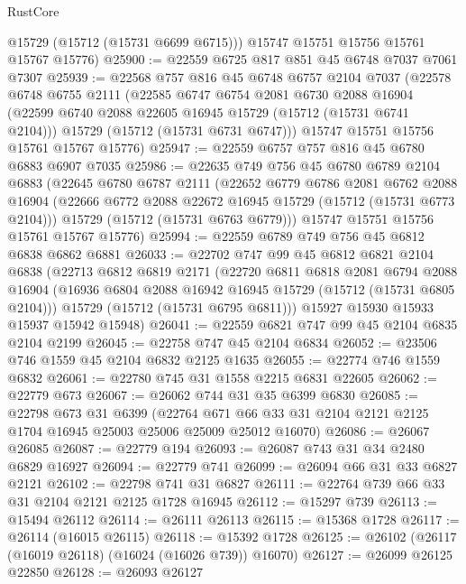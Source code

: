 \begin{lexlean}{RustCore}
\begin{coremodule}
        @15729
        (@15712 (@15731 @6699 @6715)))
      @15747
      @15751
      @15756
      @15761
      @15767
      @15776)
@25900 := @22559 @6725 @817 @851 @45 @6748 @7037 @7061 @7307
@25939 := @22568
    @757
    @816
    @45
    @6748
    @6757
    @2104
    @7037
    (@22578
      @6748
      @6755
      @2111
      (@22585
        @6747
        @6754
        @2081
        @6730
        @2088
        @16904
        (@22599 @6740 @2088 @22605 @16945 @15729 (@15712 (@15731 @6741 @2104)))
        @15729
        (@15712 (@15731 @6731 @6747)))
      @15747
      @15751
      @15756
      @15761
      @15767
      @15776)
@25947 := @22559 @6757 @757 @816 @45 @6780 @6883 @6907 @7035
@25986 := @22635
    @749
    @756
    @45
    @6780
    @6789
    @2104
    @6883
    (@22645
      @6780
      @6787
      @2111
      (@22652
        @6779
        @6786
        @2081
        @6762
        @2088
        @16904
        (@22666 @6772 @2088 @22672 @16945 @15729 (@15712 (@15731 @6773 @2104)))
        @15729
        (@15712 (@15731 @6763 @6779)))
      @15747
      @15751
      @15756
      @15761
      @15767
      @15776)
@25994 := @22559 @6789 @749 @756 @45 @6812 @6838 @6862 @6881
@26033 := @22702
    @747
    @99
    @45
    @6812
    @6821
    @2104
    @6838
    (@22713
      @6812
      @6819
      @2171
      (@22720
        @6811
        @6818
        @2081
        @6794
        @2088
        @16904
        (@16936 @6804 @2088 @16942 @16945 @15729 (@15712 (@15731 @6805 @2104)))
        @15729
        (@15712 (@15731 @6795 @6811)))
      @15927
      @15930
      @15933
      @15937
      @15942
      @15948)
@26041 := @22559 @6821 @747 @99 @45 @2104 @6835 @2104 @2199
@26045 := @22758 @747 @45 @2104 @6834
@26052 := @23506 @746 @1559 @45 @2104 @6832 @2125 @1635
@26055 := @22774 @746 @1559 @6832
@26061 := @22780 @745 @31 @1558 @2215 @6831 @22605
@26062 := @22779 @673
@26067 := @26062 @744 @31 @35 @6399 @6830
@26085 := @22798
    @673
    @31
    @6399
    (@22764 @671 @66 @33 @31 @2104 @2121 @2125 @1704 @16945 @25003 @25006 @25009 @25012 @16070)
@26086 := @26067 @26085
@26087 := @22779 @194
@26093 := @26087 @743 @31 @34 @2480 @6829 @16927
@26094 := @22779 @741
@26099 := @26094 @66 @31 @33 @6827 @2121
@26102 := @22798 @741 @31 @6827
@26111 := @22764 @739 @66 @33 @31 @2104 @2121 @2125 @1728 @16945
@26112 := @15297 @739
@26113 := @15494 @26112
@26114 := @26111 @26113
@26115 := @15368 @1728
@26117 := @26114 (@16015 @26115)
@26118 := @15392 @1728
@26125 := @26102 (@26117 (@16019 @26118) (@16024 (@16026 @739)) @16070)
@26127 := @26099 @26125 @22850
@26128 := @26093 @26127

\end{coremodule}
\end{lexlean}
